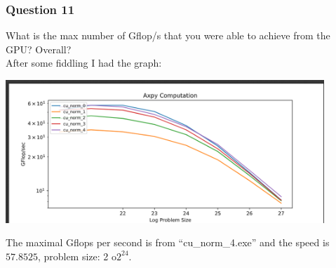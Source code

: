 \documentclass[]{article}
\begin{document}
        \subsubsection*{Question 11}
            What is the max number of Gflop/s that you were able to achieve from the GPU? Overall?
            \\[1.1em]
            After some fiddling I had the graph: 
            \\
            \begin{center}
                \includegraphics[width=12cm]{Screenshot 2021-05-27 194247.png}    
            \end{center}
            The maximal Gflops per second is from ``cu\_norm\_4.exe'' and the speed is $57.8525$, problem size: 2 o$2^{24}$. 
\end{document}
